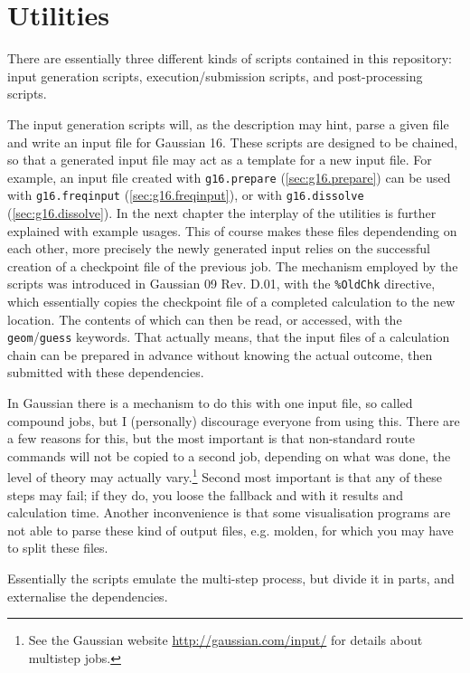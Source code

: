 \documentclass[   %
  final,          %
  a4paper         %
]{article}
\begin{document}
\section{Utilities}
\label{sec:utilities}

There are essentially three different kinds of scripts contained in this repository:
input generation scripts, execution/submission scripts, and post-processing scripts.

The input generation scripts will, as the description may hint,
parse a given file and write an input file for Gaussian 16.
These scripts are designed to be chained, 
so that a generated input file may act as a template for a new input file. 
For example, an input file created with \lstinline`g16.prepare` (\ref{sec:g16.prepare})
can be used with \lstinline`g16.freqinput` (\ref{sec:g16.freqinput}), or
with \lstinline`g16.dissolve` (\ref{sec:g16.dissolve}).
In the next chapter the interplay of the utilities is further explained with example usages.
This of course makes these files dependending on each other,
more precisely the newly generated input relies on the successful creation
of a checkpoint file of the previous job.
The mechanism employed by the scripts was introduced in Gaussian 09 Rev. D.01,
with the \texttt{\%OldChk} directive, which essentially copies the checkpoint file
of a completed calculation to the new location.
The contents of which can then be read, or accessed, with the \texttt{geom}/\texttt{guess} keywords.
That actually means, that the input files of a calculation chain can be
prepared in advance without knowing the actual outcome,
then submitted with these dependencies.

In Gaussian there is a mechanism to do this with one input file,
so called compound jobs, but I (personally) discourage everyone from using this.
There are a few reasons for this, but the most important is that non-standard 
route commands will not be copied to a second job,
depending on what was done, the level of theory may actually vary.\footnote{%
  See the Gaussian website 
  \href{http://gaussian.com/input/?tabid=1}{http://gaussian.com/input/}
  for details about multistep jobs.}
Second most important is that any of these steps may fail;
if they do, you loose the fallback and with it results and calculation time.
Another inconvenience is that some visualisation programs are not able to
parse these kind of output files, e.g. molden,
for which you may have to split these files.

Essentially the scripts emulate the multi-step process, 
but divide it in parts, and externalise the dependencies.
\end{document}
